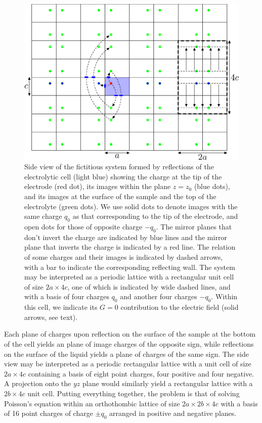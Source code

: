 \documentclass{article}
\begin{document}
\begin{figure}
  \centering
  \includegraphics[width=\textwidth]{paper-2}
  \caption{Side view of the fictitious system formed by reflections of
    the electrolytic cell (light blue)
    showing the charge at the tip of the electrode (red dot), its
    images within the plane $z=z_0$ (blue dots), and its images at the
    surface of the sample and the top of the electrolyte (green
    dots). We use solid dots to denote images with the same charge $q_0$
    as that corresponding to the tip of the electrode, and open dots for those of
    opposite charge $-q_0$. The mirror planes that don't invert the charge
    are indicated by blue lines and the mirror plane that inverts the
    charge is indicated by a red line. The relation of some charges and their images is
    indicated by dashed arrows, with a bar to indicate the
    corresponding reflecting wall. The system may be interpreted as a periodic
    lattice with a rectangular unit cell of size $2a\times 4c$, one of
    which is indicated by wide dashed lines, and with a basis of four
    charges $q_0$ and another four charges $-q_0$. Within this cell,
    we indicate its $G=0$ contribution to the electric field (solid
    arrows, see text).}
  \label{fig:sideview}
\end{figure}
Each plane of charges upon reflection on the surface of the sample at
the bottom of the cell yields an
plane of image charges of the opposite sign, while reflections
on the surface of the liquid yields a plane of charges of the same
sign. The side view may be interpreted as a periodic rectangular
lattice with a unit cell of size $2a\times 4c$ containing a basis of eight point
charges, four positive and four negative. A projection onto the $yz$
plane would similarly yield a rectangular lattice with a  $2b\times4c$
unit cell. Putting everything together, the problem is that of solving
Poisson's equation within an orthothombic lattice of size
$2a\times2b\times4c$ with a basis of 16 point charges of charge $\pm
q_0$ arranged in positive and negative planes.
\end{document}
